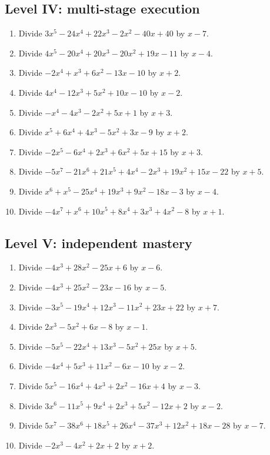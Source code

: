 \documentclass[11pt,oneside]{book}
\begin{document}
\subsection*{Level IV: multi-stage execution}
\begin{enumerate}[leftmargin=*,label=\textbf{\arabic*.},itemsep=0.65\baselineskip]
\item Divide $ 3 x^{5} - 24 x^{4} + 22 x^{3} - 2 x^{2} - 40 x + 40 $ by $x - 7$.
\item Divide $ 4 x^{5} - 20 x^{4} + 20 x^{3} - 20 x^{2} + 19 x - 11 $ by $x - 4$.
\item Divide $ - 2 x^{4} + x^{3} + 6 x^{2} - 13 x - 10 $ by $x + 2$.
\item Divide $ 4 x^{4} - 12 x^{3} + 5 x^{2} + 10 x - 10 $ by $x - 2$.
\item Divide $ - x^{4} - 4 x^{3} - 2 x^{2} + 5 x + 1 $ by $x + 3$.
\item Divide $ x^{5} + 6 x^{4} + 4 x^{3} - 5 x^{2} + 3 x - 9 $ by $x + 2$.
\item Divide $ - 2 x^{5} - 6 x^{4} + 2 x^{3} + 6 x^{2} + 5 x + 15 $ by $x + 3$.
\item Divide $ - 5 x^{7} - 21 x^{6} + 21 x^{5} + 4 x^{4} - 2 x^{3} + 19 x^{2} + 15 x - 22 $ by $x + 5$.
\item Divide $ x^{6} + x^{5} - 25 x^{4} + 19 x^{3} + 9 x^{2} - 18 x - 3 $ by $x - 4$.
\item Divide $ - 4 x^{7} + x^{6} + 10 x^{5} + 8 x^{4} + 3 x^{3} + 4 x^{2} - 8 $ by $x + 1$.
\end{enumerate}
\subsection*{Level V: independent mastery}
\begin{enumerate}[leftmargin=*,label=\textbf{\arabic*.},itemsep=0.65\baselineskip]
\item Divide $ - 4 x^{3} + 28 x^{2} - 25 x + 6 $ by $x - 6$.
\item Divide $ - 4 x^{3} + 25 x^{2} - 23 x - 16 $ by $x - 5$.
\item Divide $ - 3 x^{5} - 19 x^{4} + 12 x^{3} - 11 x^{2} + 23 x + 22 $ by $x + 7$.
\item Divide $ 2 x^{3} - 5 x^{2} + 6 x - 8 $ by $x - 1$.
\item Divide $ - 5 x^{5} - 22 x^{4} + 13 x^{3} - 5 x^{2} + 25 x $ by $x + 5$.
\item Divide $ - 4 x^{4} + 5 x^{3} + 11 x^{2} - 6 x - 10 $ by $x - 2$.
\item Divide $ 5 x^{5} - 16 x^{4} + 4 x^{3} + 2 x^{2} - 16 x + 4 $ by $x - 3$.
\item Divide $ 3 x^{6} - 11 x^{5} + 9 x^{4} + 2 x^{3} + 5 x^{2} - 12 x + 2 $ by $x - 2$.
\item Divide $ 5 x^{7} - 38 x^{6} + 18 x^{5} + 26 x^{4} - 37 x^{3} + 12 x^{2} + 18 x - 28 $ by $x - 7$.
\item Divide $ - 2 x^{3} - 4 x^{2} + 2 x + 2 $ by $x + 2$.
\end{enumerate}
\end{document}
